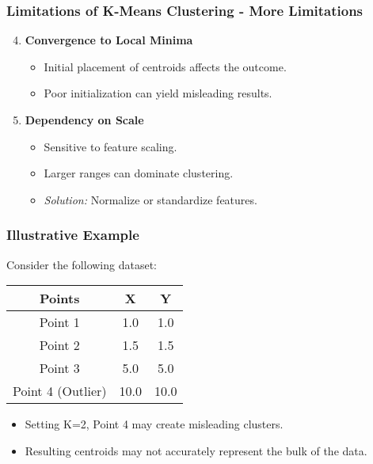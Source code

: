 \documentclass[aspectratio=169]{beamer}
\begin{document}
\begin{frame}[fragile]
    \frametitle{Limitations of K-Means Clustering - More Limitations}
    \begin{enumerate}
        \setcounter{enumi}{3}
        \item \textbf{Convergence to Local Minima}
        \begin{itemize}
            \item Initial placement of centroids affects the outcome.
            \item Poor initialization can yield misleading results.
        \end{itemize}
        
        \item \textbf{Dependency on Scale}
        \begin{itemize}
            \item Sensitive to feature scaling.
            \item Larger ranges can dominate clustering.
            \item \textit{Solution:} Normalize or standardize features.
        \end{itemize}
    \end{enumerate}
\end{frame}

\begin{frame}[fragile]
    \frametitle{Illustrative Example}
    Consider the following dataset:

    \begin{tabular}{|c|c|c|}
    \hline
    \textbf{Points} & \textbf{X} & \textbf{Y} \\
    \hline
    Point 1 & 1.0 & 1.0 \\
    Point 2 & 1.5 & 1.5 \\
    Point 3 & 5.0 & 5.0 \\
    Point 4 (Outlier) & 10.0 & 10.0 \\
    \hline
    \end{tabular}

    \begin{itemize}
        \item Setting K=2, Point 4 may create misleading clusters.
        \item Resulting centroids may not accurately represent the bulk of the data.
    \end{itemize}
\end{frame}
\end{document}
